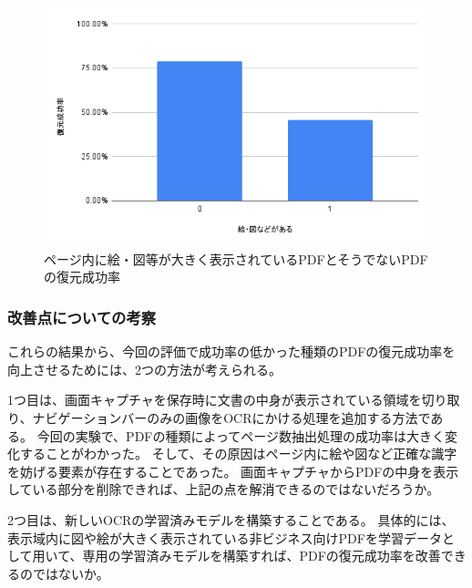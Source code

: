 \begin{figure}[htbp]
  \label{fig:success-rate-figure-or-not-pdf}
  \begin{center}
    \includegraphics[bb=0 0 600 371,width=15cm]{img/060_evaluation/consideration/pdf/success-rate-figure-or-not-pdf.pdf}
  \end{center}
  \caption{ページ内に絵・図等が大きく表示されているPDFとそうでないPDFの復元成功率}
\end{figure}

\subsubsection{改善点についての考察}
これらの結果から、今回の評価で成功率の低かった種類のPDFの復元成功率を向上させるためには、2つの方法が考えられる。

1つ目は、画面キャプチャを保存時に文書の中身が表示されている領域を切り取り、ナビゲーションバーのみの画像をOCRにかける処理を追加する方法である。
今回の実験で、PDFの種類によってページ数抽出処理の成功率は大きく変化することがわかった。
そして、その原因はページ内に絵や図など正確な識字を妨げる要素が存在することであった。
画面キャプチャからPDFの中身を表示している部分を削除できれば、上記の点を解消できるのではないだろうか。

2つ目は、新しいOCRの学習済みモデルを構築することである。
具体的には、表示域内に図や絵が大きく表示されている非ビジネス向けPDFを学習データとして用いて、専用の学習済みモデルを構築すれば、PDFの復元成功率を改善できるのではないか。
